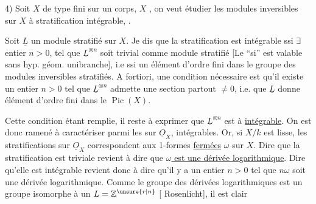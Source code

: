 4) Soit $X$ de type fini sur un corps, $X$   , on veut étudier les modules inversibles sur $X$ à stratification intégrable, . 

Soit $\underline L$ un module  stratifié sur $X$. Je dis que la stratification est intégrable ssi $\exists$ entier $n>0$,  tel que $\underline L^{\otimes n}$ soit trivial comme module stratifié [Le ``si'' est valable sans hyp. géom. unibranche], i.e ssi   un élément d'ordre fini  dans le groupe des modules inversibles stratifiés. A fortiori, une  condition nécessaire est qu'il existe un entier $n>0$  tel que $\underline L^{\otimes n}$ admette une section partout $\ne 0$, i.e. que $\underline L$ donne élément d'ordre fini  dans le $\operatorname{Pic}(X)$.

Cette condition étant remplie, il reste à exprimer que $\underline L^{\otimes n}$ est à   \uline{intégrable}. On est donc ramené à caractériser  parmi les   sur $\underline O_X$,   intégrables. Or, si $X/k$ est lisse,   les stratifications sur $\underline O_X$ correspondent aux  1-formes \uline{fermées} $\omega$ sur $X$.  Dire que la stratification  est triviale  revient à dire que \uline{$\omega$ est une dérivée logarithmique}. Dire qu'elle est intégrable revient donc à dire qu'il y a un entier $n>0$ tel que $n\omega$ soit une dérivée logarithmique. Comme le groupe des dérivées logarithmiques est un groupe isomorphe à un $L=\mathbb Z^{\unsure{r|n}}$ [ Rosenlicht], il est clair
